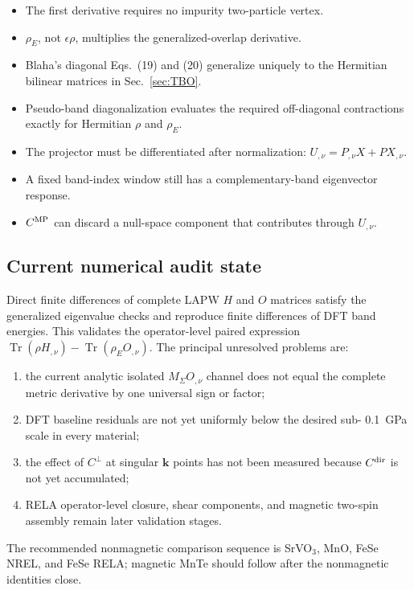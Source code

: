 \documentclass[11pt]{article}
\numberwithin{equation}{section}
\newcommand{\Tr}{\operatorname{Tr}}
\newcommand{\kb}{\mathbf k}
\begin{document}
\begin{itemize}
\item The first derivative requires no impurity two-particle vertex.
\item $\rho_E$, not $\epsilon\rho$, multiplies the generalized-overlap
      derivative.
\item Blaha's diagonal Eqs.~(19) and (20) generalize uniquely to the Hermitian
      bilinear matrices in Sec.~\ref{sec:TBO}.
\item Pseudo-band diagonalization evaluates the required off-diagonal
      contractions exactly for Hermitian $\rho$ and $\rho_E$.
\item The projector must be differentiated after normalization:
      $U_{,\nu}=P_{,\nu}X+PX_{,\nu}$.
\item A fixed band-index window still has a complementary-band eigenvector
      response.
\item $C^{\rm MP}$ can discard a null-space component that contributes through
      $U_{,\nu}$.
\end{itemize}

\subsection{Current numerical audit state}

Direct finite differences of complete LAPW $H$ and $O$ matrices satisfy the
generalized eigenvalue checks and reproduce finite differences of DFT band
energies.  This validates the operator-level paired expression
$\Tr(\rho H_{,\nu})-\Tr(\rho_EO_{,\nu})$.  The principal unresolved problems
are:

\begin{enumerate}
\item the current analytic isolated $M_\Sigma O_{,\nu}$ channel does not equal
      the complete metric derivative by one universal sign or factor;
\item DFT baseline residuals are not yet uniformly below the desired
      sub-
      \SI{0.1}{GPa} scale in every material;
\item the effect of $C^\perp$ at singular $\kb$ points has not been measured
      because $C^{\rm dir}$ is not yet accumulated;
\item RELA operator-level closure, shear components, and magnetic two-spin
      assembly remain later validation stages.
\end{enumerate}

The recommended nonmagnetic comparison sequence is SrVO$_3$, MnO, FeSe NREL,
and FeSe RELA; magnetic MnTe should follow after the nonmagnetic identities
close.
\end{document}
